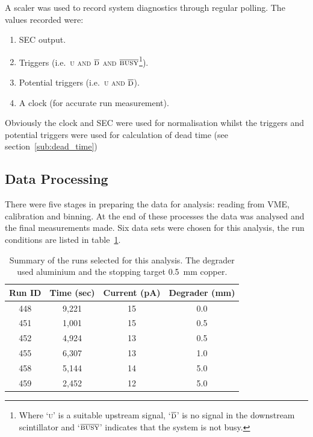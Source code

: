 A scaler was used to record system diagnostics through regular polling. The values recorded were:
\begin{enumerate}
  \item SEC output.
  \item Triggers (i.e.\ \textsc{u and }\(\overline{\textsc{d}}\)\textsc{ and }\(\overline{\textsc{busy}}\)\footnote{Where `\textsc{u}' is a suitable upstream signal, `\(\overline{\textsc{d}}\)' is no signal in the downstream scintillator and `\(\overline{\textsc{busy}}\)' indicates that the system is not busy.}).
  \item Potential triggers (i.e.\ \textsc{u and }\(\overline{\textsc{d}}\)).
  \item A clock (for accurate run measurement).
\end{enumerate}
Obviously the clock and SEC were used for normalisation whilst the triggers and potential triggers were used for calculation of dead time (see section~\ref{sub:dead_time})

\subsection{Data Processing} %
\label{sec:data_processing}
There were five stages in preparing the data for analysis: reading from VME, calibration and binning. At the end of these processes the data was analysed and the final measurements made. Six data sets were chosen for this analysis, the run conditions are listed in table~\ref{tab:run_summary}.
\begin{table}
	\begin{center}
	\begin{tabular}{c|c|c|c}
		Run ID & Time (sec) & Current (pA) & Degrader (mm) \\
		\hline
		448    & 9,221      & 15           & 0.0   \\
		451    & 1,001      & 15           & 0.5   \\
		452    & 4,924      & 13           & 0.5   \\
		455    & 6,307      & 13           & 1.0   \\
		458    & 5,144      & 14           & 5.0   \\
		459    & 2,452      & 12           & 5.0   \\
	\end{tabular}
	\end{center}
	\caption{Summary of the runs selected for this analysis. The degrader used aluminium and the stopping target 0.5~mm copper.}
	\label{tab:run_summary}
\end{table} 

